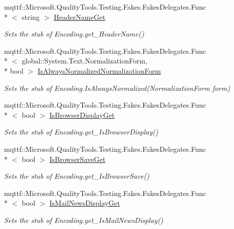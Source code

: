 \begin{DoxyCompactItemize}
mqttf\-::\-Microsoft.\-Quality\-Tools.\-Testing.\-Fakes.\-Fakes\-Delegates.\-Func\\*
$<$ string $>$ \hyperlink{class_system_1_1_text_1_1_fakes_1_1_stub_u_t_f8_encoding_ab6331e2c7701e4e5507c0e186e9c4943}{Header\-Name\-Get}
\begin{DoxyCompactList}\small\item\em Sets the stub of Encoding.\-get\-\_\-\-Header\-Name()\end{DoxyCompactList}\item 
mqttf\-::\-Microsoft.\-Quality\-Tools.\-Testing.\-Fakes.\-Fakes\-Delegates.\-Func\\*
$<$ global\-::\-System.\-Text.\-Normalization\-Form, \\*
bool $>$ \hyperlink{class_system_1_1_text_1_1_fakes_1_1_stub_u_t_f8_encoding_aaeaf26c99bec61bbc167c67a8fbd9b83}{Is\-Always\-Normalized\-Normalization\-Form}
\begin{DoxyCompactList}\small\item\em Sets the stub of Encoding.\-Is\-Always\-Normalized(\-Normalization\-Form form)\end{DoxyCompactList}\item 
mqttf\-::\-Microsoft.\-Quality\-Tools.\-Testing.\-Fakes.\-Fakes\-Delegates.\-Func\\*
$<$ bool $>$ \hyperlink{class_system_1_1_text_1_1_fakes_1_1_stub_u_t_f8_encoding_aaaaba93029cca6046e958ac1da43fb42}{Is\-Browser\-Display\-Get}
\begin{DoxyCompactList}\small\item\em Sets the stub of Encoding.\-get\-\_\-\-Is\-Browser\-Display()\end{DoxyCompactList}\item 
mqttf\-::\-Microsoft.\-Quality\-Tools.\-Testing.\-Fakes.\-Fakes\-Delegates.\-Func\\*
$<$ bool $>$ \hyperlink{class_system_1_1_text_1_1_fakes_1_1_stub_u_t_f8_encoding_a5de81f70d991a03da87240a5891bb0fa}{Is\-Browser\-Save\-Get}
\begin{DoxyCompactList}\small\item\em Sets the stub of Encoding.\-get\-\_\-\-Is\-Browser\-Save()\end{DoxyCompactList}\item 
mqttf\-::\-Microsoft.\-Quality\-Tools.\-Testing.\-Fakes.\-Fakes\-Delegates.\-Func\\*
$<$ bool $>$ \hyperlink{class_system_1_1_text_1_1_fakes_1_1_stub_u_t_f8_encoding_a55000d9b0030a8130707838165510356}{Is\-Mail\-News\-Display\-Get}
\begin{DoxyCompactList}\small\item\em Sets the stub of Encoding.\-get\-\_\-\-Is\-Mail\-News\-Display()\end{DoxyCompactList}\item 

\end{DoxyCompactItemize}
